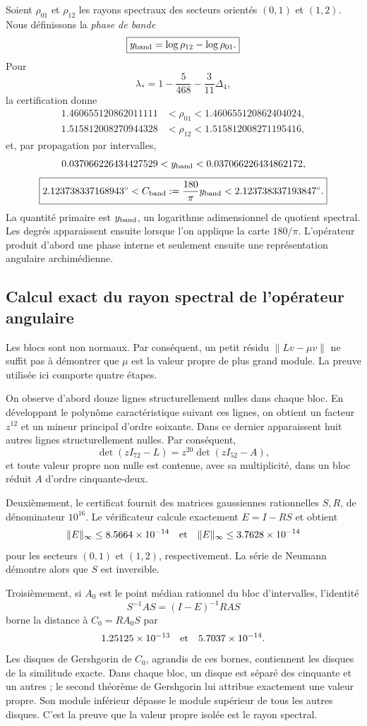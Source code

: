Soient \(\rho_{01}\) et \(\rho_{12}\) les rayons spectraux des secteurs
orientés \((0,1)\) et \((1,2)\). Nous définissons la \emph{phase de bande}
\[
 \boxed{y_{\rm band}=\log\rho_{12}-\log\rho_{01}.}
\]
Pour
\[
 \lambda_*
 =1-\frac5{468}-\frac3{11}\Delta_4,
\]
la certification donne
\[
\begin{aligned}
1.460655120862011111
&<\rho_{01}<1.460655120862404024,\\
1.515812008270944328
&<\rho_{12}<1.515812008271195416,
\end{aligned}
\]
et, par propagation par intervalles,
\[
 0.037066226434427529
 <y_{\rm band}<
 0.037066226434862172,
\]
\[
 \boxed{
 2.123738337168943^\circ
 <C_{\rm band}:=\frac{180}{\pi}y_{\rm band}
 <2.123738337193847^\circ.}
\]
La quantité primaire est \(y_{\rm band}\), un logarithme adimensionnel de quotient
spectral. Les degrés apparaissent ensuite lorsque l’on applique la carte
\(180/\pi\). L’opérateur produit d’abord une phase interne et seulement ensuite
une représentation angulaire archimédienne.

\subsection{Calcul exact du rayon spectral de l’opérateur angulaire}

Les blocs sont non normaux. Par conséquent, un petit résidu
\(\|Lv-\mu v\|\) ne suffit pas à démontrer que \(\mu\) est la valeur propre de
plus grand module. La preuve utilisée ici comporte quatre étapes.

On observe d’abord douze lignes structurellement nulles dans chaque bloc. En
développant le polynôme caractéristique suivant ces lignes, on obtient un facteur
\(z^{12}\) et un mineur principal d’ordre soixante. Dans ce dernier apparaissent huit
autres lignes structurellement nulles. Par conséquent,
\[
 \det(zI_{72}-L)=z^{20}\det(zI_{52}-A),
\]
et toute valeur propre non nulle est contenue, avec sa multiplicité, dans un bloc
réduit \(A\) d’ordre cinquante-deux.

Deuxièmement, le certificat fournit des matrices gaussiennes rationnelles
\(S,R\), de dénominateur \(10^{16}\). Le vérificateur calcule exactement
\(E=I-RS\) et obtient
\[
 \|E\|_\infty\le8.5664\times10^{-14}
 \quad\hbox{et}\quad
 \|E\|_\infty\le3.7628\times10^{-14}
\]
pour les secteurs \((0,1)\) et \((1,2)\), respectivement. La série de
Neumann démontre alors que \(S\) est inversible.

Troisièmement, si \(A_0\) est le point médian rationnel du bloc d’intervalles, l’identité
\[
 S^{-1}AS=(I-E)^{-1}RAS
\]
borne la distance à \(C_0=RA_0S\) par
\[
 1.25125\times10^{-13}
 \quad\hbox{et}\quad
 5.7037\times10^{-14}.
\]
Les disques de Gershgorin de \(C_0\), agrandis de ces bornes, contiennent
les disques de la similitude exacte. Dans chaque bloc, un disque est séparé
des cinquante et un autres ; le second théorème de Gershgorin lui attribue
exactement une valeur propre. Son module inférieur dépasse le module supérieur de
tous les autres disques. C’est la preuve que la valeur propre isolée est le
rayon spectral.

